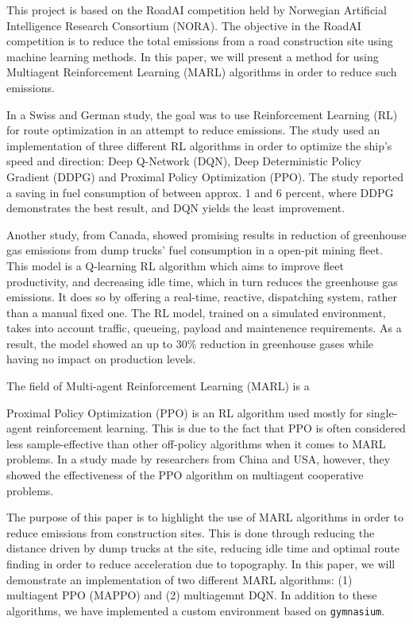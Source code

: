 \documentclass[conference]{IEEEtran}
\begin{document}
This project is based on the RoadAI competition held by Norwegian Artificial Intelligence Research
Consortium (NORA). \cite{noraRoadAIReducing} The objective in the RoadAI competition is to reduce the
total \coo{} emissions from a road construction site using machine learning methods. In this paper, we will
present a method for using Multiagent Reinforcement Learning (MARL) algorithms in order to reduce such
emissions.

In a Swiss and German study, the goal was to use Reinforcement Learning (RL) for route optimization in
an attempt to reduce \coo emissions. \cite{MORADI2022111882} The study used an implementation of three
different RL algorithms in order to optimize the ship's speed and direction: Deep Q-Network (DQN),
Deep Deterministic Policy Gradient (DDPG) and Proximal Policy Optimization (PPO). The study reported a
saving in fuel consumption of between approx. 1 and 6 percent, where DDPG demonstrates the best result,
and DQN yields the least improvement.

Another study, from Canada, \cite{HUO2023106664} showed promising results in reduction of greenhouse gas
emissions
from dump trucks' fuel consumption in a open-pit mining fleet. This model is a Q-learning RL algorithm
which aims to improve fleet productivity, and decreasing idle time, which in turn reduces the greenhouse
gas emissions. It does so by offering a real-time, reactive,  dispatching system, rather than a manual
fixed one. The RL model, trained on a simulated environment, takes into account traffic, queueing,
payload and maintenence requirements. As a result, the model showed an up to 30\% reduction in greenhouse
gases while having no impact on production levels.

The field of Multi-agent Reinforcement Learning (MARL) is a


Proximal Policy Optimization (PPO) is an RL algorithm used mostly for single-agent reinforcement learning.
This is due to the fact that PPO is often considered less sample-effective than other off-policy algorithms
when it comes to MARL problems. In a study made by researchers from China and USA, however, they showed the
effectiveness of the PPO algorithm on multiagent cooperative problems. \cite{yu2022surprising}


The purpose of this paper is to highlight the use of MARL algorithms in order to reduce \coo emissions
from construction sites. This is done through reducing the distance driven by dump trucks at the site,
reducing idle time and optimal route finding in order to reduce acceleration due to topography. In this
paper, we will demonstrate an implementation of two different MARL algorithms:
(1) multiagent PPO (MAPPO) and (2) multiagemnt DQN. In addition to these algorithms, we have implemented a
custom environment based on \texttt{gymnasium}. \cite{Towers_Gymnasium}
\end{document}
